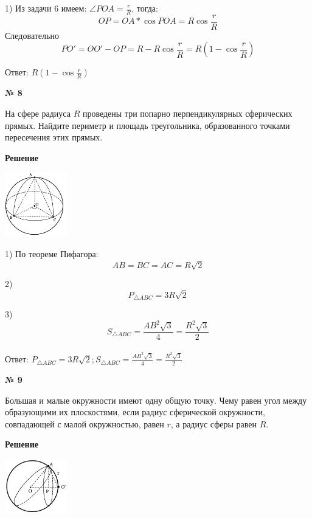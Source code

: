     1) Из задачи 6 имеем: $\angle POA = \frac{r}{R}$, тогда:
    \[
        OP = OA * \cos POA = R\cos \frac{r}{R}
    \]
    Следовательно
    \[
        PO' = OO' - OP = R - R\cos \frac{r}{R} = R\left(1 - \cos \frac{r}{R}\right)
    \]

    Ответ: $R\left(1 - \cos \frac{r}{R}\right)$

    \begin{center}
        \textbf{№ 8}
    \end{center}

    На сфере радиуса $R$ проведены три попарно перпендикулярных сферических прямых.
    Найдите периметр и площадь треугольника, образованного точками пересечения этих прямых.

    \textbf{Решение}\\

    \begin{center}
        \includegraphics[width=0.2\textwidth]{images/img11}\\
    \end{center}

    1) По теореме Пифагора:
    \[
        AB = BC = AC = R\sqrt {2}
    \]

    2)\[
          P_{\triangle ABC} = 3R\sqrt {2}
    \]

    3)
    \[
        S_{\triangle ABC} = \frac{AB^2\sqrt {3}}{4} = \frac{R^2\sqrt {3}}{2}
    \]\\

    Ответ: $P_{\triangle ABC} = 3R\sqrt {2}; S_{\triangle ABC} = \frac{AB^2\sqrt {3}}{4} = \frac{R^2\sqrt {3}}{2}$


    \begin{center}
        \textbf{№ 9}
    \end{center}

    Большая и малые окружности имеют одну общую точку.
    Чему равен угол между образующими их плоскостями, если радиус сферической окружности,
    совпадающей с малой окружностью, равен $r$, а радиус сферы равен $R$.

    \textbf{Решение}\\

    \begin{center}
        \includegraphics[width=0.2\textwidth]{images/img12}\\
    \end{center}

